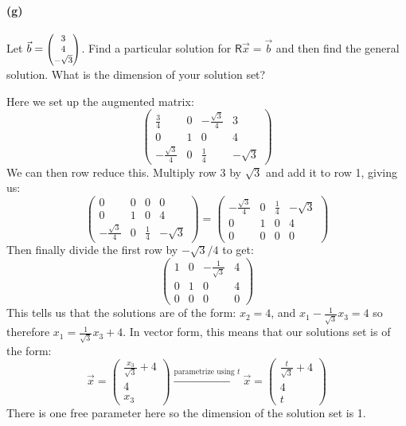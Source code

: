 \documentclass{article}
\begin{document}
\paragraph{(g)}
Let $\vec{b} = \smthreevect{3}{4}{-\sqrt{3}}$.  Find a particular solution for $\mathsf{R}\vec{x} = \vec{b}$ and then find the general solution.  What is the dimension
of your solution set?

\begin{solution}
	Here we set up the augmented matrix:
	\[
		\begin{pmatrix} \frac{3}{4} &0&-\frac{\sqrt{3}}{4}&3\\0&1&0&4\\-\frac{\sqrt{3} }{4}&0&\frac{1}{4}&-\sqrt{3}   \end{pmatrix} 
	\] 
	We can then row reduce this. Multiply row 3 by $\sqrt{3}$ and add it to row 1, giving us:
	\[
		\begin{pmatrix} 0&0&0&0\\0&1&0&4\\-\frac{\sqrt{3} }{4}&0&\frac{1}{4}&-\sqrt{3}  \end{pmatrix} = \begin{pmatrix} -\frac{\sqrt{3}}{4} &0&\frac{1}{4}&-\sqrt{3}\\0&1&0&4\\0&0&0&0 \end{pmatrix} 
	\] 
	Then finally divide the first row by $-\sqrt{3}/4$ to get: 
	\[
		\begin{pmatrix} 1&0&-\frac{1}{\sqrt{3} }&4\\0&1&0&4\\0&0&0&0\end{pmatrix} 
	\] 
	This tells us that the solutions are of the form: $x_2 = 4$, and $x_1 - \frac{1}{\sqrt{3} }x_3 = 4$ so 
	therefore $x_1 = \frac{1}{\sqrt{3} }x_3 + 4$. In vector form, this means that our solutions set is of the form:
\[
	\vec x = \begin{pmatrix} \frac{x_3}{\sqrt{3} } + 4\\4\\x_3 \end{pmatrix} \xrightarrow{\text{parametrize using $t$}} \vec x = \begin{pmatrix} \frac{t}{\sqrt{3} }+4\\4\\t \end{pmatrix} 
\] 
	There is one free parameter here so the
	dimension of the solution set is 1. 
\end{solution}
\bigskip
\pagebreak
\end{document}
